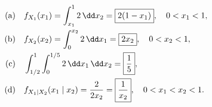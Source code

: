 \documentclass[11pt,oneside]{article}
\begin{document}
\begin{solution}
\begin{align*}
\textup{(a)}\quad&f_{X_1}(x_1)=\int_{x_1}^1 2\,\dd x_2=\boxed{2(1-x_1)},\quad0<x_1<1,\\
\textup{(b)}\quad&f_{X_2}(x_2)=\int_0^{x_2}2\,\dd x_1=\boxed{2x_2},\quad0<x_2<1,\\
\textup{(c)}\quad&\int_{1/2}^1\int_0^{1/5}2\,\dd x_1\,\dd x_2=\boxed{\frac15},\\
\textup{(d)}\quad&f_{X_1\mid X_2}(x_1\mid x_2)=\frac2{2x_2}=\boxed{\frac1{x_2}},\quad0<x_1<x_2<1.
\end{align*}
\end{solution}
\end{document}
